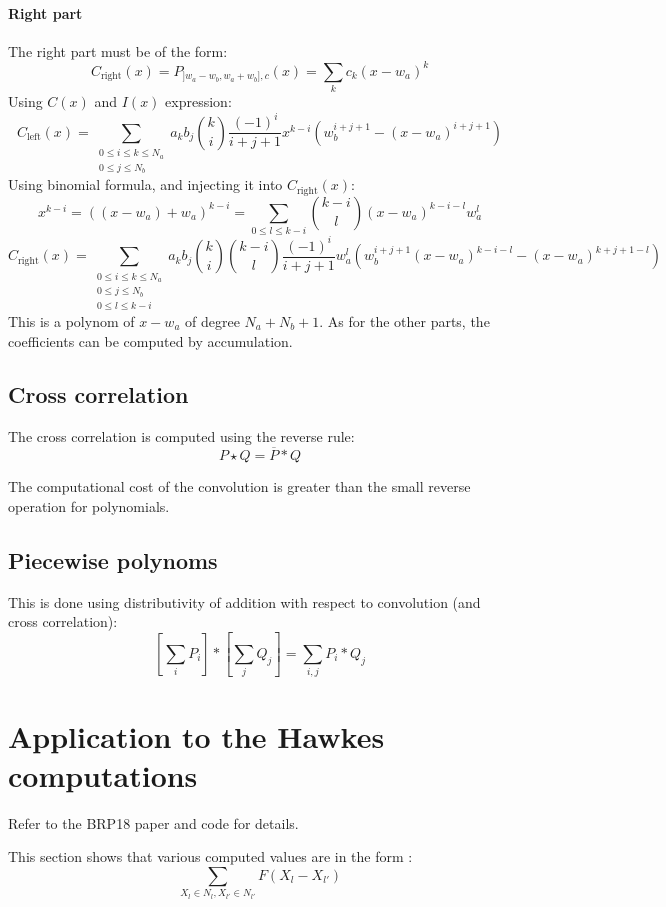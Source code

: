 \documentclass[a4paper,10pt]{article}
\newcommand\Convolution{\ast}
\newcommand\Correlation{\star}
\newcommand\Reversed[1]{\overline{#1}}
\begin{document}
\paragraph{Right part}
The right part must be of the form:
\[
	C_\text{right}(x) = P_{]w_a-w_b, w_a+w_b], c}(x) = \sum_k c_k (x - w_a)^k
\]
Using $C(x)$ and $I(x)$ expression:
\[
    C_\text{left}(x) = \sum_{\substack{0 \le i \le k \le N_a \\ 0 \le j \le N_b}}
    a_k b_j \binom{k}{i} \frac{(-1)^i}{i+j+1} x^{k-i} \left( w_b^{i+j+1} - (x-w_a)^{i+j+1} \right)
\]
Using binomial formula, and injecting it into $C_\text{right}(x)$:
\[
	x^{k-i} = ((x-w_a) + w_a)^{k-i} = \sum_{0 \le l \le k-i} \binom{k-i}{l} (x-w_a)^{k-i-l} w_a^l
\]
\[
    C_\text{right}(x) = \sum_{\substack{0 \le i \le k \le N_a \\ 0 \le j \le N_b \\ 0 \le l \le k-i}}
    a_k b_j \binom{k}{i} \binom{k-i}{l} \frac{(-1)^i}{i+j+1} w_a^l \left( w_b^{i+j+1} (x-w_a)^{k-i-l} - (x-w_a)^{k+j+1-l} \right)
\]
This is a polynom of $x-w_a$ of degree $N_a + N_b + 1$.
As for the other parts, the coefficients can be computed by accumulation.

\subsection{Cross correlation}
The cross correlation is computed using the reverse rule:
\[ P \Correlation Q = \Reversed{P} \Convolution Q \]

The computational cost of the convolution is greater than the small reverse operation for polynomials.

\subsection{Piecewise polynoms}
This is done using distributivity of addition with respect to convolution (and cross correlation):
\[ \left[\sum_i P_i \right] \Convolution \left[\sum_j Q_j \right] = \sum_{i,j} P_i \Convolution Q_j \]

\section{Application to the Hawkes computations}
Refer to the BRP18 paper and code for details.

This section shows that various computed values are in the form :
\[ \sum_{X_l \in N_l, X_{l'} \in N_{l'}} F(X_l-X_{l'}) \]
\end{document}
